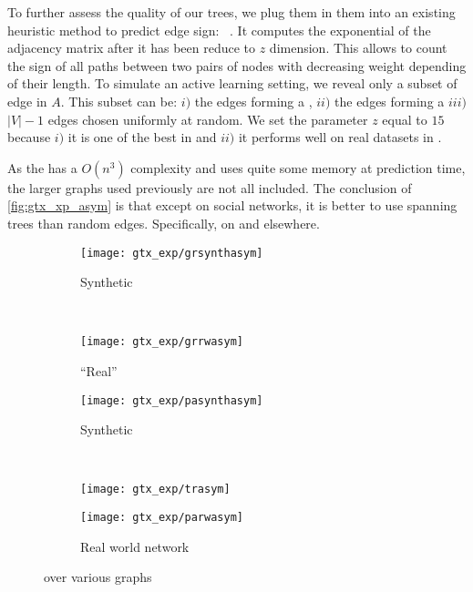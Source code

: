 To further assess the quality of our trees, we plug them in them into an existing heuristic method
to predict edge sign: \asym{}~\autocite{Kunegis2009}.
It computes the exponential of the adjacency matrix after it has
been reduce to $z$ dimension. This allows to count the sign of all paths between two pairs of nodes
with decreasing weight depending of their length. To simulate an active learning setting, we reveal
only a subset of edge in $A$. This subset can be: $i)$ the edges forming a \bfs{}, $ii)$ the edges
forming a \gtx{} $iii)$ $|V|-1$ edges chosen uniformly at random.
We set the parameter $z$ equal to $15$ because $i)$ it is one of the best in \cite[Fig.
11]{Kunegis2009} and $ii)$ it performs well on real datasets in \cite[Fig.3]{Cesa-Bianchi2012a}.

As the \asym{} has a $O(n^3)$ complexity and uses quite some memory at prediction time, the larger
graphs used previously are not all included. The conclusion of \autoref{fig:gtx_xp_asym} is that
except on social networks, it is better to use spanning trees than random edges. Specifically, \gtx{}
on \grid{} and \bfs{} elsewhere.

\begin{figure}[tbh]
	\centering
	\begin{subfigure}[b]{0.47\textwidth}
		\texttt{[image: gtx\_exp/grsynthasym]}
		\caption{Synthetic \grid{} \label{fig:gtx_xp_grsynthasym}}
	\end{subfigure}~
	\begin{subfigure}[b]{0.47\textwidth}
		\texttt{[image: gtx\_exp/grrwasym]}
		\caption{\enquote{Real} \grid{} }\label{fig:gtx_xp_grrwasym}
	\end{subfigure}
	\begin{subfigure}[b]{0.47\textwidth}
		\texttt{[image: gtx\_exp/pasynthasym]}
		\caption{Synthetic \lpa{} }\label{fig:gtx_xp_pasynthasym}
	\end{subfigure}~
	\begin{subfigure}[b]{0.47\textwidth}
		\texttt{[image: gtx\_exp/trasym]}
		\caption{\triangle{} }\label{fig:gtx_xp_trasym}
	\end{subfigure}
	\begin{subfigure}[b]{0.47\textwidth}
		\texttt{[image: gtx\_exp/parwasym]}
		\caption{Real world network }\label{fig:gtx_xp_parwasym}
	\end{subfigure}
	\caption{\asym{} over various graphs}\label{fig:gtx_xp_asym}
\end{figure}

\iffalse
Finally\marginpars{Actually I never did it because \shz{} wasn't implemented at the time, so now is
a good occasion}\todo*{Run shazoo on galaxy tree} we also compare \gtx{} with \bfs{} and \rst{} on
the task of nodes prediction using \shz{} algorithm~\autocite{Vitale2012}.
\fi
